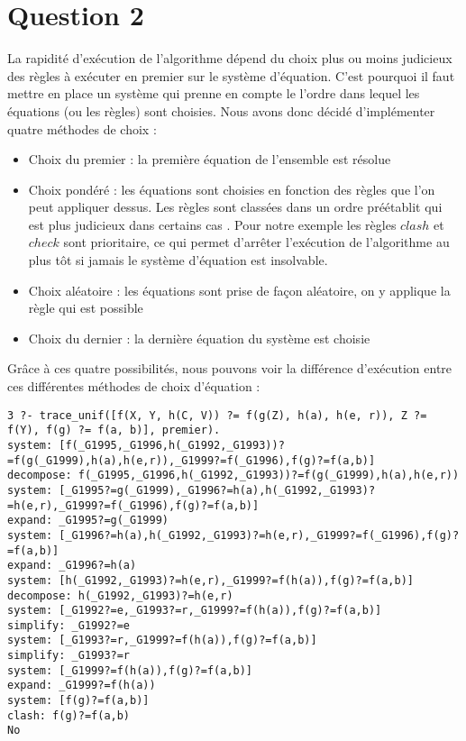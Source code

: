 \documentclass[10pt,a4paper]{report}
\begin{document}
\chapter*{Question 2}
La rapidité d'exécution de l'algorithme dépend du choix plus ou moins judicieux des règles à exécuter en premier sur le système d'équation. C'est pourquoi il faut mettre en place un système qui prenne en compte le l'ordre dans lequel les équations (ou les règles) sont choisies.
Nous avons donc décidé d'implémenter quatre méthodes de choix :
\begin{itemize}
\item Choix du premier : la première équation de l'ensemble est résolue
\item Choix pondéré : les équations sont choisies en fonction des règles que l'on peut appliquer dessus. Les règles sont classées dans un ordre préétablit qui est plus judicieux dans certains cas . Pour notre exemple les règles $clash$ et $check$ sont prioritaire, ce qui permet d'arrêter l'exécution de l'algorithme au plus tôt si jamais le système d'équation est insolvable.
\item Choix aléatoire : les équations sont prise de façon aléatoire, on y applique la règle qui est possible
\item Choix du dernier : la dernière équation du système est choisie
\end{itemize}

Grâce à ces quatre possibilités, nous pouvons voir la différence d'exécution entre ces différentes méthodes de choix d'équation :
\begin{lstlisting}[caption ={Exemple d'exécution avec le choix de la première équation }]
3 ?- trace_unif([f(X, Y, h(C, V)) ?= f(g(Z), h(a), h(e, r)), Z ?= f(Y), f(g) ?= f(a, b)], premier).
system: [f(_G1995,_G1996,h(_G1992,_G1993))?=f(g(_G1999),h(a),h(e,r)),_G1999?=f(_G1996),f(g)?=f(a,b)]
decompose: f(_G1995,_G1996,h(_G1992,_G1993))?=f(g(_G1999),h(a),h(e,r))
system: [_G1995?=g(_G1999),_G1996?=h(a),h(_G1992,_G1993)?=h(e,r),_G1999?=f(_G1996),f(g)?=f(a,b)]
expand: _G1995?=g(_G1999)
system: [_G1996?=h(a),h(_G1992,_G1993)?=h(e,r),_G1999?=f(_G1996),f(g)?=f(a,b)]
expand: _G1996?=h(a)
system: [h(_G1992,_G1993)?=h(e,r),_G1999?=f(h(a)),f(g)?=f(a,b)]
decompose: h(_G1992,_G1993)?=h(e,r)
system: [_G1992?=e,_G1993?=r,_G1999?=f(h(a)),f(g)?=f(a,b)]
simplify: _G1992?=e
system: [_G1993?=r,_G1999?=f(h(a)),f(g)?=f(a,b)]
simplify: _G1993?=r
system: [_G1999?=f(h(a)),f(g)?=f(a,b)]
expand: _G1999?=f(h(a))
system: [f(g)?=f(a,b)]
clash: f(g)?=f(a,b)
No

\end{lstlisting}
\end{document}

